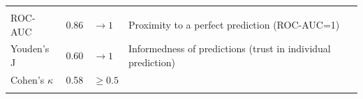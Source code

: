 \documentclass[10pt,oneside]{article}
\begin{document}
\begin{longtable}[]{@{}llll@{}}
\begin{minipage}[t]{0.49\columnwidth}
\strut
\end{minipage}\tabularnewline
\begin{minipage}[t]{0.21\columnwidth}\raggedright
ROC-AUC\strut
\end{minipage} & \begin{minipage}[t]{0.05\columnwidth}\raggedright
0.86\strut
\end{minipage} & \begin{minipage}[t]{0.13\columnwidth}\raggedright
\(\rightarrow 1\)\strut
\end{minipage} & \begin{minipage}[t]{0.49\columnwidth}\raggedright
Proximity to a perfect prediction (ROC-AUC=1)\strut
\end{minipage}\tabularnewline
\begin{minipage}[t]{0.21\columnwidth}\raggedright
Youden's J\strut
\end{minipage} & \begin{minipage}[t]{0.05\columnwidth}\raggedright
0.60\strut
\end{minipage} & \begin{minipage}[t]{0.13\columnwidth}\raggedright
\(\rightarrow 1\)\strut
\end{minipage} & \begin{minipage}[t]{0.49\columnwidth}\raggedright
Informedness of predictions (trust in individual prediction)\strut
\end{minipage}\tabularnewline
\begin{minipage}[t]{0.21\columnwidth}\raggedright
Cohen's \(\kappa\)\strut
\end{minipage} & \begin{minipage}[t]{0.05\columnwidth}\raggedright
0.58\strut
\end{minipage} & \begin{minipage}[t]{0.13\columnwidth}\raggedright
\(\ge 0.5\)\strut
\end{minipage} & \begin{minipage}[t]{0.49\columnwidth}\raggedright
\strut
\end{minipage}\tabularnewline
\begin{minipage}[t]{0.21\columnwidth}\raggedright
\strut
\end{minipage} & \begin{minipage}[t]{0.05\columnwidth}\raggedright
\strut
\end{minipage} & \begin{minipage}[t]{0.13\columnwidth}\raggedright
\strut
\end{minipage} & \begin{minipage}[t]{0.49\columnwidth}\raggedright

\end{minipage}
\end{longtable}
\end{document}
